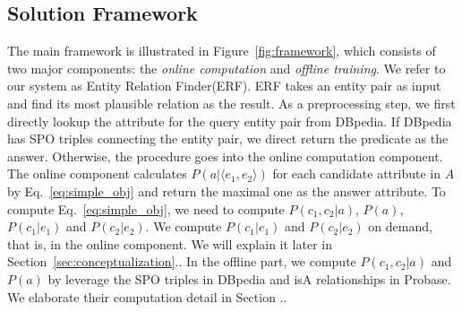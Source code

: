 
\subsection{Solution Framework}
The main framework is illustrated in Figure~\ref{fig:framework}, which consists of two major components: the {\it online computation} and {\it offline training}. We refer to our system as \ac{Entity Relation Finder(ERF)}.
ERF takes an entity pair as input and find its most plausible relation as the result.
As a preprocessing step, we first directly lookup the attribute for the query entity pair from DBpedia.
If DBpedia has SPO triples connecting the entity pair, we direct return the predicate as the answer.
Otherwise, the procedure goes into the online computation component.
The online component calculates $ P(a|  \langle e_1,e_2 \rangle  )$ for each candidate attribute in $A$ by Eq.~\ref{eq:simple_obj} and return the maximal one as the answer attribute. To compute Eq.~\ref{eq:simple_obj}, we need to compute $P(c_1,c_2|a)$, $P(a)$, $P(c_1|e_1)$ and $P(c_2|e_2)$. We compute $P(c_1|e_1)$ and $P(c_2|e_2)$ on demand, that is, in the online component. We will explain it later in Section~\ref{sec:conceptualization}..
In the offline part, we compute $P(c_1,c_2|a)$ and $P(a)$ by leverage the SPO triples in DBpedia and isA relationships in Probase.
We elaborate their computation detail in Section ..



